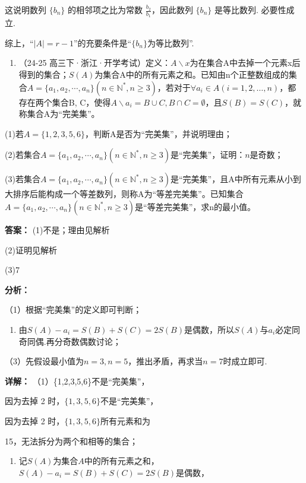 \documentclass[11pt,a4paper]{ctexart}
\begin{document}
这说明数列 \(\{b_n\}\) 的相邻项之比为常数 \(\frac{b_2}{b_1}\)，因此数列 \(\{b_n\}\) 是等比数列. 必要性成立.

综上，``\(|A|=r-1\)''的充要条件是``\(\{b_{n}\}\)为等比数列''.

\begin{enumerate}[label=\arabic*., leftmargin=*, start=24]
\item （24-25
  高三下·浙江·开学考试）定义：\(A \backslash x\)为在集合A中去掉一个元素x后得到的集合；\(S(A)\)为集合A中的所有元素之和。已知由n个正整数组成的集合\(A = \{a_1, a_2, \cdots, a_n\} (n \in \mathbb{N}^*, n \geq 3)\)，若对于\(\forall a_i \in A (i = 1, 2, \ldots, n)\)，都存在两个集合B,
  C，使得\(A \backslash a_i = B \cup C, B \cap C = \emptyset\)，且\(S(B) = S(C)\)，就称集合A为``完美集''。
\end{enumerate}

(1)若\(A=\{1,2,3,5,6\}\)，判断A是否为``完美集''，并说明理由；

(2)若集合\(A = \{a_{1}, a_{2}, \cdots, a_{n}\} (n \in \mathbb{N}^{*}, n \geq 3)\)是``完美集''，证明：\(n\)是奇数；

(3)若集合\(A=\{a_{1},a_{2},\cdots,a_{n}\}(n\in \mathbb{N}^{*},n\geq3)\)是``完美集''，且A中所有元素从小到大排序后能构成一个等差数列，则称A为``等差完美集''。已知集合\(A=\{a_{1},a_{2},\cdots,a_{n}\}(n\in \mathbb{N}^{*},n\geq3)\)是``等差完美集''，求n的最小值。

\textbf{答案：}
(1)不是；理由见解析

(2)证明见解析

(3)7

\textbf{分析：}

（1）根据``完美集''的定义即可判断；

\begin{enumerate}[label=\arabic*., leftmargin=*, start=2]
\item 由\(S(A) - a_{i} = S(B) + S(C) = 2S(B)\)是偶数，所以\(S(A)\)与\(a_{i}\)必定同奇同偶.再分奇数偶数讨论；
\end{enumerate}

（3）先假设最小值为\(n = 3, n = 5\)，推出矛盾，再求当\(n = 7\)时成立即可.

\textbf{详解：}
（1）\{1,2,3,5,6\}不是``完美集''，

因为去掉 2 时，\(\{1,3,5,6\}\)不是``完美集''，

因为去掉 2 时，\(\{1,3,5,6\}\)所有元素和为

15，无法拆分为两个和相等的集合；

\begin{enumerate}[label=\arabic*., leftmargin=*, start=2]
\item 记\(S(A)\)为集合\(A\)中的所有元素之和，\(S(A) - a_i = S(B) + S(C) = 2S(B)\)是偶数，
\end{enumerate}
\end{document}
